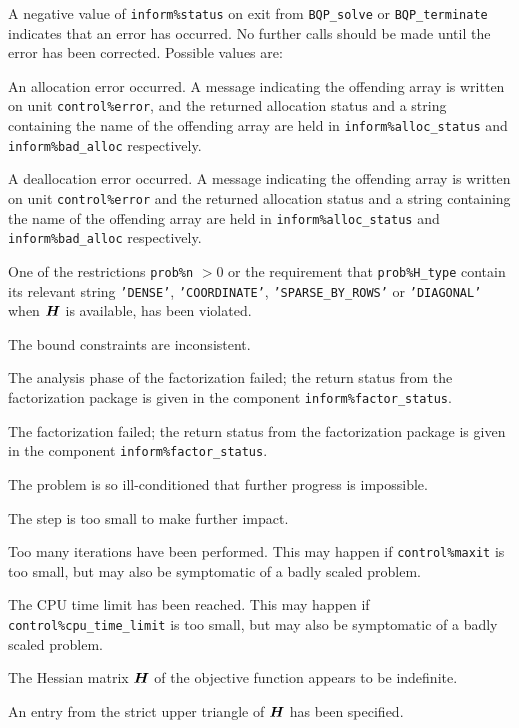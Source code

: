 \documentclass{galahad}
\newcommand{\packagename}{BQP}
\begin{document}
\galerrors
A negative value of {\tt inform\%status} on exit from 
{\tt \packagename\_solve}
or 
{\tt \packagename\_terminate}
indicates that an error has occurred. No further calls should be made
until the error has been corrected. Possible values are:

\begin{description}

 An allocation error occurred. A message indicating 
the offending 
array is written on unit {\tt control\%error}, and the returned allocation 
status and a string containing the name of the offending array
are held in {\tt inform\%alloc\_\-status}
and {\tt inform\%bad\_alloc} respectively.

 A deallocation error occurred. 
A message indicating the offending 
array is written on unit {\tt control\%error} and the returned allocation 
status and a string containing the name of the offending array
are held in {\tt inform\%alloc\_\-status}
and {\tt inform\%bad\_alloc} respectively.

 One of the restrictions 
 {\tt prob\%n} $> 0$ 
    or the requirement that 
    {\tt prob\%H\_type} contain its relevant string
    {\tt 'DENSE'}, {\tt 'COORDINATE'}, {\tt 'SPARSE\_BY\_ROWS'}
    or {\tt 'DIAGONAL'} when ${\bm{H}}$ is available,
    has been violated.


 The bound constraints are inconsistent.

 The analysis phase of the factorization failed; 
  the return status from the factorization
    package is given in the component {\tt inform\%fac\-t\-or\_status}.

 The factorization failed; the return status 
  from the factorization
    package is given in the component {\tt inform\%fac\-t\-or\_status}.

 The problem is so ill-conditioned that 
 further progress is impossible.

 The step is too small to make further impact.

 Too many iterations have been performed. 
   This may happen if
    {\tt control\%maxit} is too small, but may also be symptomatic of 
    a badly scaled problem.

 The CPU time limit has been reached. This may happen if
    {\tt control\%cpu\_time\_limit} is too small, but may also be symptomatic 
    of a badly scaled problem.

 The Hessian matrix ${\bm{H}}$ of the objective function 
  appears to be indefinite.

 An entry from the strict upper triangle of ${\bm{H}}$ 
 has been specified.

\end{description}
\end{document}
